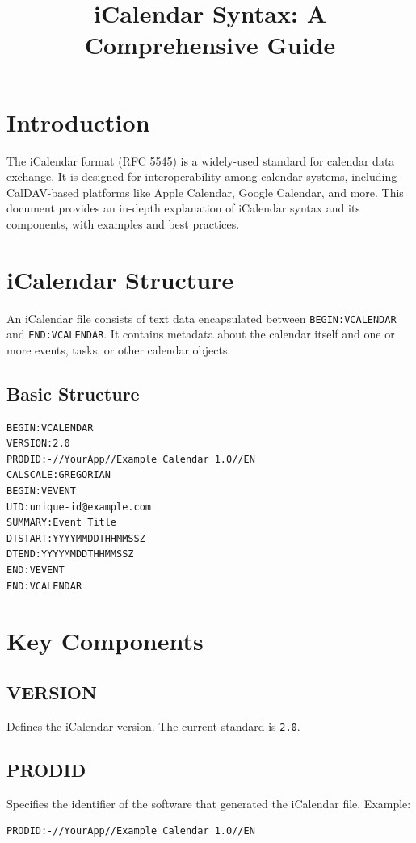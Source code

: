 \documentclass[a4paper,12pt]{article}
\title{\textbf{iCalendar Syntax: A Comprehensive Guide}}
\author{}
\date{}
\begin{document}
\maketitle

\tableofcontents
\newpage

\section{Introduction}
The iCalendar format (RFC 5545) is a widely-used standard for calendar data exchange. It is designed for interoperability among calendar systems, including CalDAV-based platforms like Apple Calendar, Google Calendar, and more. This document provides an in-depth explanation of iCalendar syntax and its components, with examples and best practices.

\section{iCalendar Structure}
An iCalendar file consists of text data encapsulated between \texttt{BEGIN:VCALENDAR} and \texttt{END:VCALENDAR}. It contains metadata about the calendar itself and one or more events, tasks, or other calendar objects.

\subsection{Basic Structure}
\begin{verbatim}
BEGIN:VCALENDAR
VERSION:2.0
PRODID:-//YourApp//Example Calendar 1.0//EN
CALSCALE:GREGORIAN
BEGIN:VEVENT
UID:unique-id@example.com
SUMMARY:Event Title
DTSTART:YYYYMMDDTHHMMSSZ
DTEND:YYYYMMDDTHHMMSSZ
END:VEVENT
END:VCALENDAR
\end{verbatim}

\section{Key Components}
\subsection{VERSION}
Defines the iCalendar version. The current standard is \texttt{2.0}.

\subsection{PRODID}
Specifies the identifier of the software that generated the iCalendar file. Example:
\begin{verbatim}
PRODID:-//YourApp//Example Calendar 1.0//EN
\end{verbatim}
\end{document}
